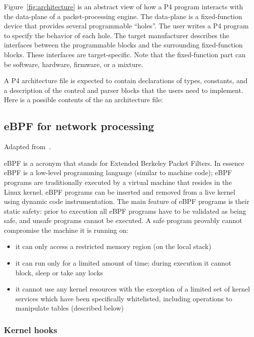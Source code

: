 Figure~\ref{fig:architecture} is an abstract view of how a P4 program
interacts with the data-plane of a packet-processing engine.  The
data-plane is a fixed-function device that provides several
programmable ``holes''.  The user writes a P4 program to specify the
behavior of each hole.  The target manufacturer describes the
interfaces between the programmable blocks and the surrounding
fixed-function blocks.  These interfaces are target-specific.  Note
that the fixed-function part can be software, hardware, firmware, or a
mixture.

A P4 architecture file is expected to contain declarations of
types, constants, and a description of the control and parser blocks
that the users need to implement.  Here is a possible contents of the
an architecture file:

\subsection{eBPF for network processing}

Adapted from~\cite{p4-ebpf-backend}.

eBPF is a acronym that stands for Extended Berkeley Packet Filters. In
essence eBPF is a low-level programming language (similar to machine
code); eBPF programs are traditionally executed by a virtual machine
that resides in the Linux kernel. eBPF programs can be inserted and
removed from a live kernel using dynamic code instrumentation. The
main feature of eBPF programs is their static safety: prior to
execution all eBPF programs have to be validated as being safe, and
unsafe programs cannot be executed. A safe program provably cannot
compromise the machine it is running on:

\begin{itemize}
\item it can only access a restricted memory region (on the local stack)
\item it can run only for a limited amount of time; during execution
  it cannot block, sleep or take any locks
\item it cannot use any kernel resources with the exception of a
  limited set of kernel services which have been specifically
  whitelisted, including operations to manipulate tables (described
  below)
\end{itemize}

\subsubsection{Kernel hooks}

